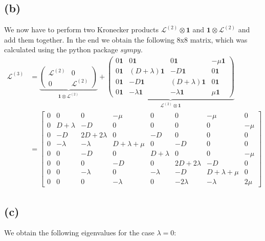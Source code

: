 \documentclass{article}
\begin{document}
\subsection*{(b)}
We now have to perform two Kronecker products $\mathcal{L}^{(2)} \otimes \mathbf{1}$ and $\mathbf{1} \otimes \mathcal{L}^{(2)}$ and add them together. In the end we obtain the following 8x8 matrix, which was calculated using the python package $sympy$.
\begin{align}
\mathcal{L}^{(3)} &=
\underbrace{
\begin{pmatrix}
\mathcal{L}^{(2)}  & 0 \\
0                  & \mathcal{L}^{(2)}
\end{pmatrix}
}_{\mathbf{1}\otimes \mathcal{L}^{(2)}}
+
\underbrace{
\begin{pmatrix}
0\mathbf{1} & 0\mathbf{1} & 0\mathbf{1} & -\mu \mathbf{1} \\
0\mathbf{1} & (D+\lambda)\mathbf{1} & -D\mathbf{1} & 0\mathbf{1} \\
0\mathbf{1} & -D\mathbf{1} & (D+\lambda)\mathbf{1} & 0\mathbf{1} \\
0\mathbf{1} & -\lambda\mathbf{1} & -\lambda\mathbf{1} & \mu\mathbf{1}
\end{pmatrix}
}_{\mathcal{L}^{(2)}\otimes \mathbf{1}} \\
    &=
\left[\begin{matrix}0 & 0 & 0 & - \mu & 0 & 0 & - \mu & 0\\0 & D + \lambda & - D & 0 & 0 & 0 & 0 & - \mu\\0 & - D & 2 D + 2 \lambda & 0 & - D & 0 & 0 & 0\\0 & - \lambda & - \lambda & D + \lambda + \mu & 0 & - D & 0 & 0\\0 & 0 & - D & 0 & D + \lambda & 0 & 0 & - \mu\\0 & 0 & 0 & - D & 0 & 2 D + 2 \lambda & - D & 0\\0 & 0 & - \lambda & 0 & - \lambda & - D & D + \lambda + \mu & 0\\0 & 0 & 0 & - \lambda & 0 & - 2 \lambda & - \lambda & 2 \mu\end{matrix}\right]
\end{align}

\subsection*{(c)}
We obtain the following eigenvalues for the case $\lambda = 0$:
\end{document}
